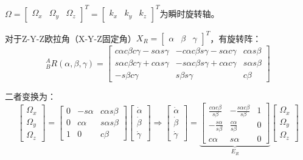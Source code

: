 \documentclass[
12pt, %
a4paper, 
oneside, %
headinclude,footinclude, %
]{scrartcl}
\begin{document}
$ \Omega = \begin{bmatrix} \Omega_x & \Omega_y & \Omega_z \end{bmatrix}^T = \begin{bmatrix} k_x & k_y & k_z \end{bmatrix}^T $为瞬时旋转轴。

对于Z-Y-Z欧拉角（X-Y-Z固定角）$ X_R = \begin{bmatrix} \alpha & \beta & \gamma \end{bmatrix}^T $，有旋转阵：
$$
^A_B R(\alpha, \beta, \gamma) =
\begin{bmatrix}
c\alpha c\beta c\gamma - s\alpha s\gamma & -c\alpha c\beta s\gamma - s\alpha c\gamma & c\alpha s\beta \\
s\alpha c\beta c\gamma + c\alpha s\gamma & -s\alpha c\beta s\gamma + c\alpha c\gamma & s\alpha s\beta \\
-s\beta c\gamma & s\beta s\gamma & c\beta
\end{bmatrix}
$$

二者变换为：
$$
\begin{bmatrix} \Omega_x \\ \Omega_y \\ \Omega_z \end{bmatrix}
=
\begin{bmatrix} 0 & -s\alpha & c\alpha s\beta \\ 0 & c\alpha & s\alpha s\beta \\ 1 & 0 & c\beta \end{bmatrix}
\begin{bmatrix} \dot{\alpha} \\ \dot{\beta} \\ \dot{\gamma} \end{bmatrix}
\Rightarrow 
\begin{bmatrix} \dot{\alpha} \\ \dot{\beta} \\ \dot{\gamma} \end{bmatrix}
=
\underbrace{\left[
\begin{array}{ccc}
\frac{c\alpha c\beta}{s\beta} & -\frac{s\alpha c\beta}{s\beta} & 1 \\
-\frac{s\alpha}{s\beta} & \frac{c\alpha}{s\beta} & 0 \\
c\alpha & s\alpha & 0
\end{array}
\right]}_{E_R}
\begin{bmatrix} \Omega_x \\ \Omega_y \\ \Omega_z \end{bmatrix}
$$
\end{document}

